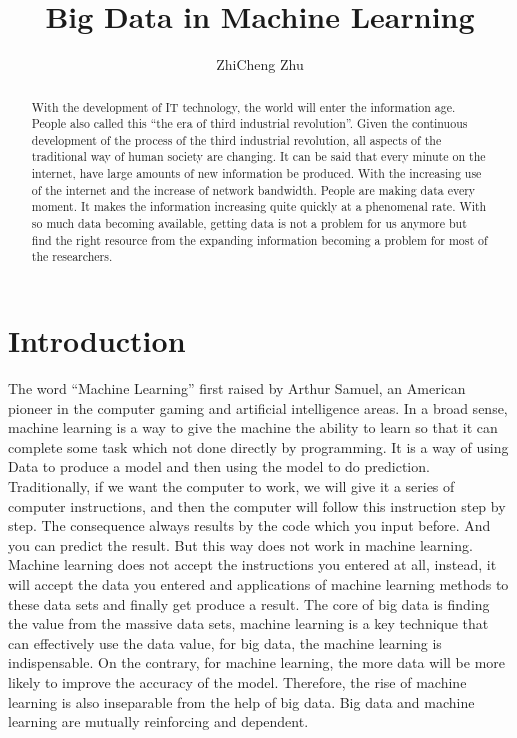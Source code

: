 \documentclass[sigconf]{acmart}
\begin{document}
\title{Big Data in Machine Learning}


\author{ZhiCheng Zhu}


\begin{abstract}

    With the development of IT technology, the world will enter the information age. People also called this “the era of third industrial revolution”. Given the continuous development of the process of the third industrial revolution, all aspects of the traditional way of human society are changing. It can be said that every minute on the internet, have large amounts of new information be produced. With the increasing use of the internet and the increase of network bandwidth. People are making data every moment. It makes the information increasing quite quickly at a phenomenal rate. With so much data becoming available, getting data is not a problem for us anymore but find the right resource from the expanding information becoming a problem for most of the researchers. 
    
\end{abstract}


\maketitle

\section{Introduction}
The word ``Machine Learning'' first raised by Arthur Samuel, an American pioneer in the computer gaming and artificial intelligence areas. In a broad sense, machine learning is a way to give the machine the ability to learn so that it can complete some task which not done directly by programming. It is a way of using Data to produce a model and then using the model to do prediction. Traditionally, if we want the computer to work, we will give it a series of computer instructions, and then the computer will follow this instruction step by step. The consequence always results by the code which you input before. And you can predict the result. But this way does not work in machine learning. Machine learning does not accept the instructions you entered at all, instead, it will accept the data you entered and applications of machine learning methods to these data sets and finally get produce a result. The core of big data is finding the value from the massive data sets, machine learning is a key technique that can effectively use the data value, for big data, the machine learning is indispensable. On the contrary, for machine learning, the more data will be more likely to improve the accuracy of the model. Therefore, the rise of machine learning is also inseparable from the help of big data. Big data and machine learning are mutually reinforcing and dependent.
\end{document}
